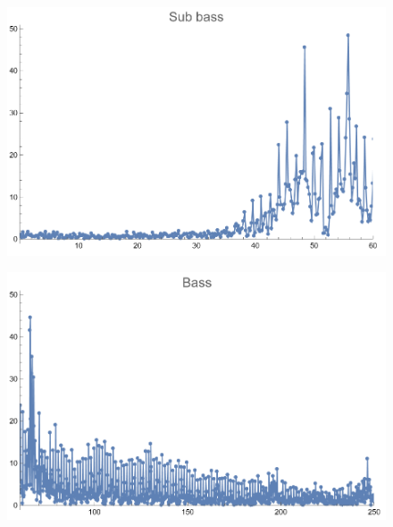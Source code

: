 \documentclass[12pt, letterpaper]{article}
\begin{document}
\begin{figure}[H]
  \centering
  \begin{minipage}{.5\textwidth}
    \centering
    \includegraphics[width=.9\linewidth]{imgs/Cancion5/subbass.png}
    \label{fig:05b}
  \end{minipage}%
  \begin{minipage}{.5\textwidth}
    \centering
    \includegraphics[width=.9\linewidth]{imgs/Cancion5/bass.png}
    \label{fig:05c}
  \end{minipage}
\end{figure}
\end{document}
